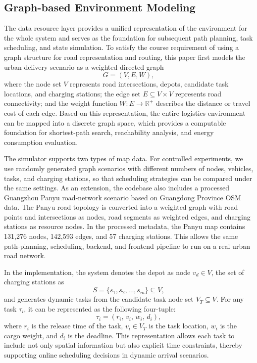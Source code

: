 \subsection{Graph-based Environment Modeling}
The data resource layer provides a unified representation of the environment for the whole system and serves as the foundation for subsequent path planning, task scheduling, and state simulation. To satisfy the course requirement of using a graph structure for road representation and routing, this paper first models the urban delivery scenario as a weighted directed graph
\[
G=(V,E,W),
\]
where the node set \(V\) represents road intersections, depots, candidate task locations, and charging stations; the edge set \(E\subseteq V\times V\) represents road connectivity; and the weight function \(W:E\rightarrow \mathbb{R}^{+}\) describes the distance or travel cost of each edge. Based on this representation, the entire logistics environment can be mapped into a discrete graph space, which provides a computable foundation for shortest-path search, reachability analysis, and energy consumption evaluation.

The simulator supports two types of map data. For controlled experiments, we use randomly generated graph scenarios with different numbers of nodes, vehicles, tasks, and charging stations, so that scheduling strategies can be compared under the same settings. As an extension, the codebase also includes a processed Guangzhou Panyu road-network scenario based on Guangdong Province OSM data. The Panyu road topology is converted into a weighted graph with road points and intersections as nodes, road segments as weighted edges, and charging stations as resource nodes. In the processed metadata, the Panyu map contains 131,276 nodes, 142,593 edges, and 57 charging stations. This allows the same path-planning, scheduling, backend, and frontend pipeline to run on a real urban road network.

In the implementation, the system denotes the depot as node \(v_d\in V\), the set of charging stations as
\[
S=\{s_1,s_2,\dots,s_m\}\subseteq V,
\]
and generates dynamic tasks from the candidate task node set \(V_T\subseteq V\). For any task \(\tau_i\), it can be represented as the following four-tuple:
\[
\tau_i=(r_i,\, v_i,\, w_i,\, d_i),
\]
where \(r_i\) is the release time of the task, \(v_i\in V_T\) is the task location, \(w_i\) is the cargo weight, and \(d_i\) is the deadline. This representation allows each task to include not only spatial information but also explicit time constraints, thereby supporting online scheduling decisions in dynamic arrival scenarios.

